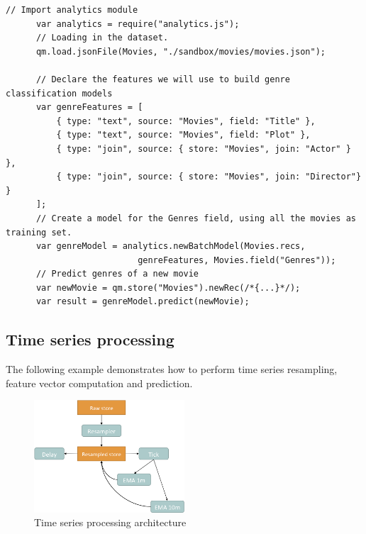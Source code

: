 \documentclass{article} %
\begin{document}
      \begin{lstlisting}[caption={Text mining: storage, feature extraction, classification and regression}] 	
      // Import analytics module
      var analytics = require("analytics.js");
      // Loading in the dataset.
      qm.load.jsonFile(Movies, "./sandbox/movies/movies.json");
       	
      // Declare the features we will use to build genre classification models
      var genreFeatures = [
          { type: "text", source: "Movies", field: "Title" },
          { type: "text", source: "Movies", field: "Plot" },
          { type: "join", source: { store: "Movies", join: "Actor" } },
          { type: "join", source: { store: "Movies", join: "Director"} }
      ];
      // Create a model for the Genres field, using all the movies as training set.
      var genreModel = analytics.newBatchModel(Movies.recs,
                          genreFeatures, Movies.field("Genres"));
      // Predict genres of a new movie
      var newMovie = qm.store("Movies").newRec(/*{...}*/);
      var result = genreModel.predict(newMovie);
      \end{lstlisting}

   \subsection{Time series processing}
      The following example demonstrates how to perform time series resampling, feature vector computation and prediction.

      \begin{figure}[h]
      \begin{center}
      \includegraphics[width=0.5\textwidth]{timeSeries.png}
      \end{center}
      \caption{Time series processing architecture}
      \end{figure}
\end{document}
